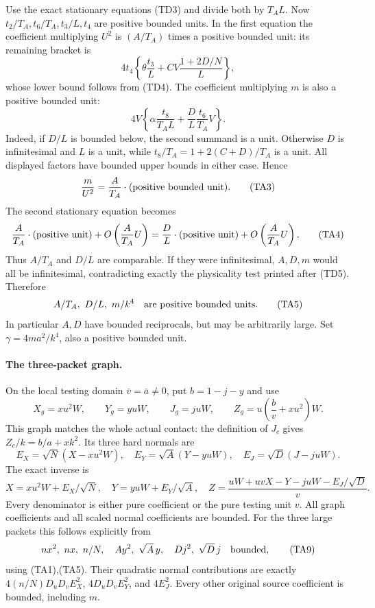 Use the exact stationary equations (TD3) and divide both by
$T_A L$. Now $t_2/T_A,t_6/T_A,t_3/L,t_4$ are positive bounded
units. In the first equation the coefficient multiplying $U^2$ is
$(A/T_A)$ times a positive bounded unit: its remaining bracket is
\[
 4t_4\left\{\theta\frac{t_3}{L}
            +CV\frac{1+2D/N}{L}\right\},
\]
whose lower bound follows from (TD4). The coefficient multiplying
$m$ is also a positive bounded unit:
\[
 4V\left\{\alpha\frac{t_8}{T_A L}
              +\frac{D}{L}\frac{t_6}{T_A}V\right\}.             \tag{TA2}
\]
Indeed, if $D/L$ is bounded below, the second summand is a unit.
Otherwise $D$ is infinitesimal and $L$ is a unit, while
$t_8/T_A=1+2(C+D)/T_A$ is a unit. All displayed factors have
bounded upper bounds in either case. Hence
\[
 \frac{m}{U^2}=\frac{A}{T_A}\cdot(\hbox{positive bounded unit}). \tag{TA3}
\]
The second stationary equation becomes
\[
 \frac{A}{T_A}\cdot(\hbox{positive unit})
       +O\left(\frac{A}{T_A}U\right)
 =\frac{D}{L}\cdot(\hbox{positive unit})
       +O\left(\frac{A}{T_A}U\right).                          \tag{TA4}
\]
Thus $A/T_A$ and $D/L$ are comparable. If they were infinitesimal,
$A,D,m$ would all be infinitesimal, contradicting exactly the
physicality test printed after (TD5). Therefore
\[
 A/T_A,\ D/L,\ m/k^4\quad\hbox{are positive bounded units}.       \tag{TA5}
\]
In particular $A,D$ have bounded reciprocals, but may be arbitrarily
large. Set $\gamma=4ma^2/k^4$, also a positive bounded unit.

\paragraph{The three-packet graph.}
On the local testing domain $\bar v=\bar a\ne0$, put
$b=1-j-y$ and use
\[
 X_g=xu^2W,\qquad Y_g=yuW,\qquad J_g=juW,\qquad
 Z_g=u\left(\frac b v+xu^2\right)W.                            \tag{TA6}
\]
This graph matches the whole actual contact: the definition of $J_c$
gives $Z_c/k=b/a+xk^2$. Its three hard normals are
\[
 E_X=\sqrt N(X-xu^2W),\quad
 E_Y=\sqrt A(Y-yuW),\quad E_J=\sqrt D(J-juW).                    \tag{TA7}
\]
The exact inverse is
\[
 X=xu^2W+E_X/\sqrt N,\quad Y=yuW+E_Y/\sqrt A,
\quad Z=\frac{uW+uvX-Y-juW-E_J/\sqrt D}{v}.                    \tag{TA8}
\]
Every denominator is either pure coefficient or the pure testing
unit $v$. All graph coefficients and all scaled normal coefficients
are bounded. For the three large packets this follows explicitly
from
\[
 n x^2,\ nx,\ n/N,\quad A y^2,\ \sqrt A\,y,\quad
 D j^2,\ \sqrt D\,j\quad\hbox{bounded},                       \tag{TA9}
\]
using (TA1),(TA5). Their quadratic normal contributions are exactly
$4(n/N)D_uD_v E_X^2$, $4D_uD_vE_Y^2$, and $4E_J^2$.
Every other original source coefficient is bounded, including $m$.

